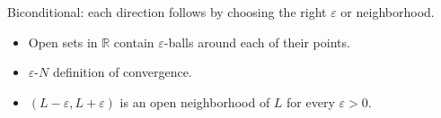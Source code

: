 \begin{remark*}
Biconditional: each direction follows by choosing the right $\varepsilon$ or neighborhood.
\end{remark*}

\begin{remark*}[Dependencies]
\begin{itemize}
  \item Open sets in $\mathbb{R}$ contain $\varepsilon$-balls around each of their points.
  \item $\varepsilon$-$N$ definition of convergence.
  \item $(L-\varepsilon, L+\varepsilon)$ is an open neighborhood of $L$ for every $\varepsilon > 0$.
\end{itemize}
\end{remark*}
